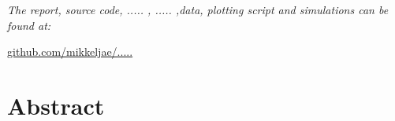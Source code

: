\vspace{1.2cm}
  \begin{center}
    \textsl{The report, source code, ..... , ..... ,data, plotting script and simulations can be found at:}  
    \end{center}
    \vspace{-5pt}
    \begin{center}
	\renewcommand{\UrlFont}{\color{black}\normalsize\tt}
    \url{github.com/mikkeljae/.....}
   \end{center}
\newpage

\section*{Abstract}
\lipsum[5]

